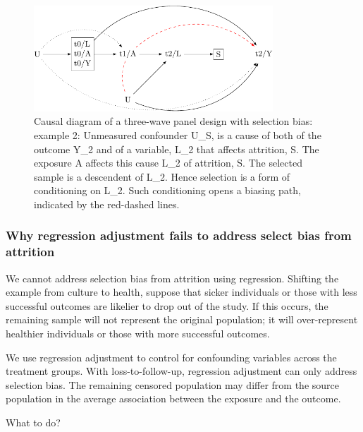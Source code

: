 \documentclass[
  singlecolumn]{article}
\begin{document}
\begin{figure}

{\centering \includegraphics[width=0.8\textwidth,height=\textheight]{causal-dags_files/figure-pdf/fig-dag-8-2-1.pdf}

}

\caption{\label{fig-dag-8-2}Causal diagram of a three-wave panel design
with selection bias: example 2: Unmeasured confounder U\_S, is a cause
of both of the outcome Y\_2 and of a variable, L\_2 that affects
attrition, S. The exposure A affects this cause L\_2 of attrition, S.
The selected sample is a descendent of L\_2. Hence selection is a form
of conditioning on L\_2. Such conditioning opens a biasing path,
indicated by the red-dashed lines.}

\end{figure}

\hypertarget{why-regression-adjustment-fails-to-address-select-bias-from-attrition}{%
\subsubsection{Why regression adjustment fails to address select bias
from
attrition}\label{why-regression-adjustment-fails-to-address-select-bias-from-attrition}}

We cannot address selection bias from attrition using regression.
Shifting the example from culture to health, suppose that sicker
individuals or those with less successful outcomes are likelier to drop
out of the study. If this occurs, the remaining sample will not
represent the original population; it will over-represent healthier
individuals or those with more successful outcomes.

We use regression adjustment to control for confounding variables across
the treatment groups. With loss-to-follow-up, regression adjustment can
only address selection bias. The remaining censored population may
differ from the source population in the average association between the
exposure and the outcome.

What to do?
\end{document}
